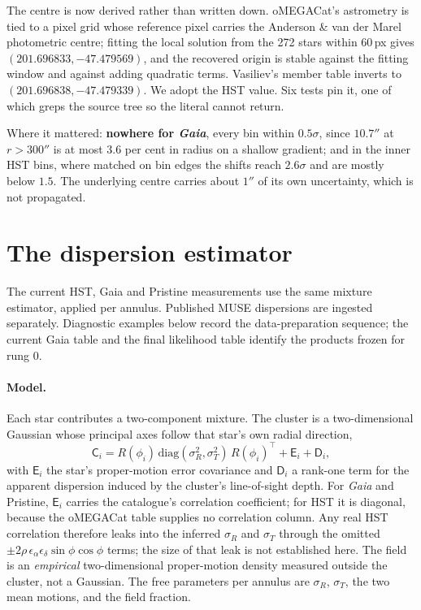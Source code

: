 \documentclass[11pt,a4paper]{article}
\begin{document}
The centre is now derived rather than written down. oMEGACat's astrometry is tied to a pixel
grid whose reference pixel carries the Anderson \& van der Marel photometric centre; fitting
the local solution from the 272 stars within 60\,px gives $(201.696833, -47.479569)$, and
the recovered origin is stable against the fitting window and against adding quadratic terms.
Vasiliev's member table inverts to $(201.696838, -47.479339)$. We adopt the HST value. Six
tests pin it, one of which greps the source tree so the literal cannot return.

Where it mattered: \textbf{nowhere for \emph{Gaia}}, every bin within $0.5\sigma$, since $10.7''$ at
$r>300''$ is at most $3.6$ per cent in radius on a shallow gradient; and in the inner HST
bins, where matched on bin edges the shifts reach $2.6\sigma$ and are mostly below $1.5$.
The underlying centre carries about $1''$ of its own uncertainty, which is not propagated.

\section{The dispersion estimator}
\label{sec:estimator}

The current HST, Gaia and Pristine measurements use the same mixture estimator, applied
per annulus. Published MUSE dispersions are ingested separately. Diagnostic examples below
record the data-preparation sequence; the current Gaia table and the final likelihood table
identify the products frozen for rung 0.

\paragraph{Model.} Each star contributes a two-component mixture. The cluster is a
two-dimensional Gaussian whose principal axes follow that star's own radial direction,
\begin{equation}
\mathsf{C}_i = R(\phi_i)\,\mathrm{diag}(\sigma_R^2,\sigma_T^2)\,R(\phi_i)^{\!\top}
              + \mathsf{E}_i + \mathsf{D}_i ,
\end{equation}
with $\mathsf{E}_i$ the star's proper-motion error covariance and $\mathsf{D}_i$ a rank-one
term for the apparent dispersion induced by the cluster's line-of-sight depth. For
\emph{Gaia} and Pristine, $\mathsf{E}_i$ carries the catalogue's correlation coefficient;
for HST it is diagonal, because the oMEGACat table supplies no correlation column. Any real
HST correlation therefore leaks into the inferred $\sigma_R$ and $\sigma_T$ through the
omitted $\pm2\rho\,\epsilon_\alpha\epsilon_\delta\sin\phi\cos\phi$ terms; the size of that
leak is not established here. The field is an \emph{empirical}
two-dimensional proper-motion density measured outside the cluster, not a Gaussian. The free
parameters per annulus are $\sigma_R$, $\sigma_T$, the two mean motions, and the field
fraction.
\end{document}
